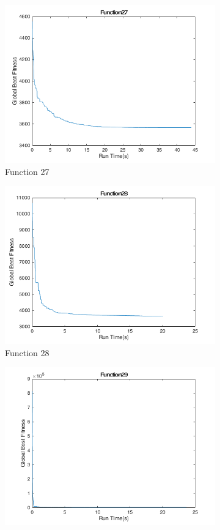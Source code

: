 \begin{figure}
\begin{subfigure}[b]{0.4\textwidth}
    \includegraphics[width=\textwidth]{img/cecrt/f27}
    \caption{Function 27}
  \end{subfigure}
  \begin{subfigure}[b]{0.4\textwidth}
    \includegraphics[width=\textwidth]{img/cecrt/f28}
    \caption{Function 28}
  \end{subfigure}
  \begin{subfigure}[b]{0.4\textwidth}
    \includegraphics[width=\textwidth]{img/cecrt/f29}

\end{subfigure}
\end{figure}
